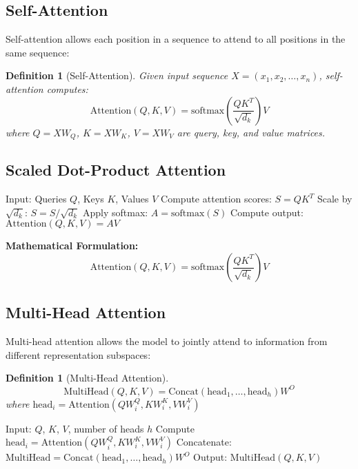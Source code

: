 \documentclass[11pt,a4paper]{article}
\newtheorem{definition}[theorem]{Definition}
\begin{document}
\subsection{Self-Attention}

Self-attention allows each position in a sequence to attend to all positions in the same sequence:

\begin{definition}[Self-Attention]
Given input sequence $X = (x_1, x_2, \ldots, x_n)$, self-attention computes:
$$\text{Attention}(Q, K, V) = \text{softmax}\left(\frac{QK^T}{\sqrt{d_k}}\right)V$$
where $Q = XW_Q$, $K = XW_K$, $V = XW_V$ are query, key, and value matrices.
\end{definition}

\subsection{Scaled Dot-Product Attention}

\begin{algorithm}
\caption{Scaled Dot-Product Attention}
\begin{algorithmic}[1]
\STATE Input: Queries $Q$, Keys $K$, Values $V$
\STATE Compute attention scores: $S = QK^T$
\STATE Scale by $\sqrt{d_k}$: $S = S / \sqrt{d_k}$
\STATE Apply softmax: $A = \text{softmax}(S)$
\STATE Compute output: $\text{Attention}(Q,K,V) = AV$
\end{algorithmic}
\end{algorithm}

\textbf{Mathematical Formulation:}
$$\text{Attention}(Q,K,V) = \text{softmax}\left(\frac{QK^T}{\sqrt{d_k}}\right)V$$

\subsection{Multi-Head Attention}

Multi-head attention allows the model to jointly attend to information from different representation subspaces:

\begin{definition}[Multi-Head Attention]
$$\text{MultiHead}(Q,K,V) = \text{Concat}(\text{head}_1, \ldots, \text{head}_h)W^O$$
where $\text{head}_i = \text{Attention}(QW_i^Q, KW_i^K, VW_i^V)$
\end{definition}

\begin{algorithm}
\caption{Multi-Head Attention}
\begin{algorithmic}[1]
\STATE Input: $Q$, $K$, $V$, number of heads $h$
    \STATE Compute $\text{head}_i = \text{Attention}(QW_i^Q, KW_i^K, VW_i^V)$
\ENDFOR
\STATE Concatenate: $\text{MultiHead} = \text{Concat}(\text{head}_1, \ldots, \text{head}_h)W^O$
\STATE Output: $\text{MultiHead}(Q,K,V)$
\end{algorithmic}
\end{algorithm}
\end{document}
